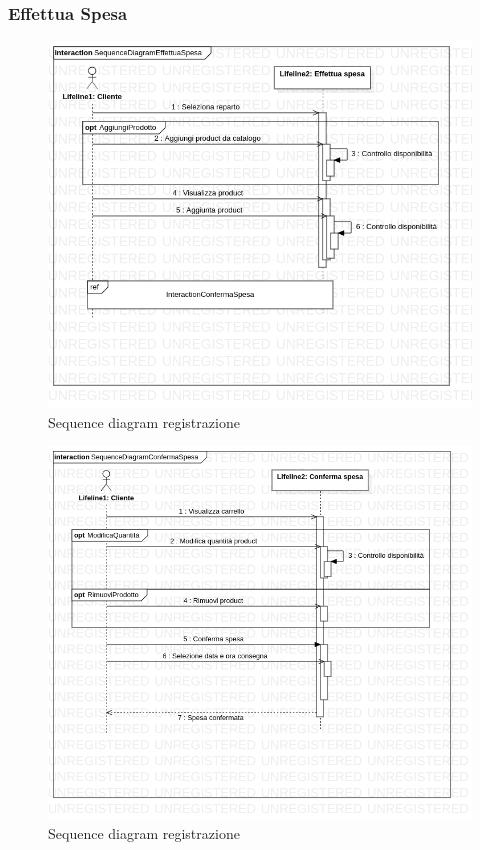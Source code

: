 \documentclass[12pt, a4paper]{article}
\numberwithin{equation}{section} %
\begin{document}
\subsubsection{Effettua Spesa}

\begin{figure}[h]
\centering
\includegraphics[width=\textwidth]{Use Case Model!Effettua spesa!InteractionEffettuaSpesa!SequenceDiagramEffettuaSpesa_3.png}
\caption{Sequence diagram registrazione}
\end{figure}

\begin{figure}[h]
\centering
\includegraphics[width=\textwidth]{Use Case Model!Conferma spesa!InteractionConfermaSpesa!SequenceDiagramConfermaSpesa_13.png}
\caption{Sequence diagram registrazione}
\end{figure}
\end{document}
